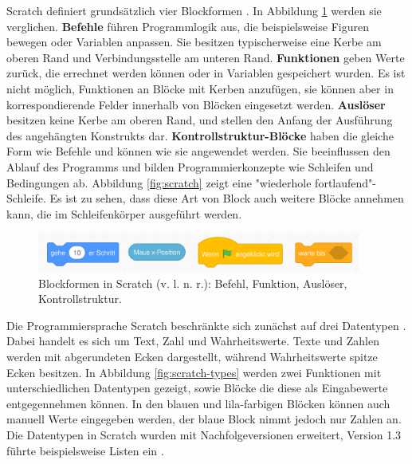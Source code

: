 Scratch definiert grundsätzlich vier Blockformen \parencite{maloneyScratchProgramming2010}. In Abbildung \ref{fig:scratch-blocks} werden sie verglichen. \textbf{Befehle} führen Programmlogik aus, die beispielsweise Figuren bewegen oder Variablen anpassen. Sie besitzen typischerweise eine Kerbe am oberen Rand und Verbindungsstelle am unteren Rand. \textbf{Funktionen} geben Werte zurück, die errechnet werden können oder in Variablen gespeichert wurden. Es ist nicht möglich, Funktionen an Blöcke mit Kerben anzufügen, sie können aber in korrespondierende Felder innerhalb von Blöcken eingesetzt werden. \textbf{Auslöser} besitzen keine Kerbe am oberen Rand, und stellen den Anfang der Ausführung des angehängten Konstrukts dar. \textbf{Kontrollstruktur-Blöcke} haben die gleiche Form wie Befehle und können wie sie angewendet werden. Sie beeinflussen den Ablauf des Programms und bilden Programmierkonzepte wie Schleifen und Bedingungen ab. Abbildung \ref{fig:scratch} zeigt eine "wiederhole fortlaufend"-Schleife. Es ist zu sehen, dass diese Art von Block auch weitere Blöcke annehmen kann, die im Schleifenkörper ausgeführt werden.
\parencite{maloneyScratchProgramming2010}

\begin{figure}
  \begin{center}
    \includegraphics[width=0.95\textwidth]{assets/scratch-blocks.png}
  \end{center}
  \caption{Blockformen in Scratch (v. l. n. r.): Befehl, Funktion, Auslöser, Kontrollstruktur. \parencite{scratchfoundationScratch}}
  \label{fig:scratch-blocks}
\end{figure}

Die Programmiersprache Scratch beschränkte sich zunächst auf drei Datentypen \parencite{maloneyScratchProgramming2010}. Dabei handelt es sich um Text, Zahl und Wahrheitswerte. Texte und Zahlen werden mit abgerundeten Ecken dargestellt, während Wahrheitswerte spitze Ecken besitzen. In Abbildung \ref{fig:scratch-types} werden zwei Funktionen mit unterschiedlichen Datentypen gezeigt, sowie Blöcke die diese als Eingabewerte entgegennehmen können. In den blauen und lila-farbigen Blöcken können auch manuell Werte eingegeben werden, der blaue Block nimmt jedoch nur Zahlen an. Die Datentypen in Scratch wurden mit Nachfolgeversionen erweitert, Version 1.3 führte beispielsweise Listen ein \parencite{harveyBringingNo2010}.


